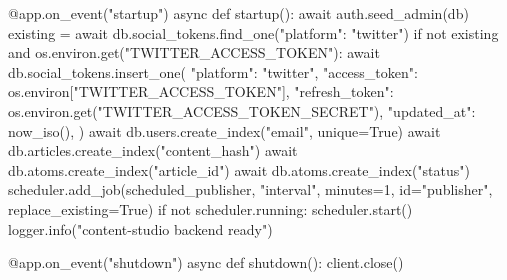 @app.on_event("startup")
async def startup():
    await auth.seed_admin(db)
    existing = await db.social_tokens.find_one({"platform": "twitter"})
    if not existing and os.environ.get("TWITTER_ACCESS_TOKEN"):
        await db.social_tokens.insert_one({
            "platform": "twitter",
            "access_token": os.environ["TWITTER_ACCESS_TOKEN"],
            "refresh_token": os.environ.get("TWITTER_ACCESS_TOKEN_SECRET"),
            "updated_at": now_iso(),
        })
    await db.users.create_index("email", unique=True)
    await db.articles.create_index("content_hash")
    await db.atoms.create_index("article_id")
    await db.atoms.create_index("status")
    scheduler.add_job(scheduled_publisher, "interval", minutes=1, id="publisher", replace_existing=True)
    if not scheduler.running:
        scheduler.start()
    logger.info("content-studio backend ready")


@app.on_event("shutdown")
async def shutdown():
    client.close()
